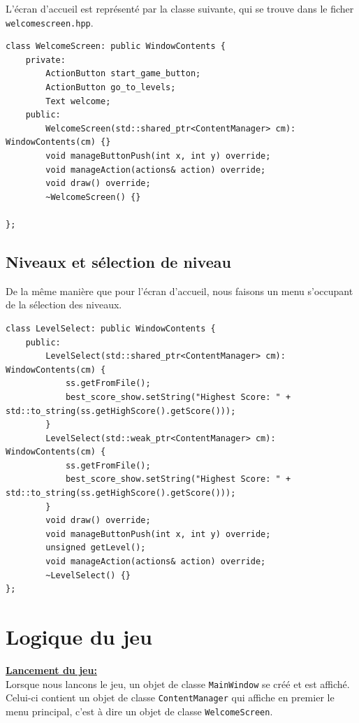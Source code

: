\documentclass[a4paper, 12pt]{article}
\begin{document}
L'écran d'accueil est représenté par la classe suivante,
qui se trouve dans le ficher \texttt{welcome\textunderscore screen.hpp}.
\begin{lstlisting}
class WelcomeScreen: public WindowContents {
    private:
        ActionButton start_game_button;
        ActionButton go_to_levels;
        Text welcome;
    public:
        WelcomeScreen(std::shared_ptr<ContentManager> cm): WindowContents(cm) {}
        void manageButtonPush(int x, int y) override;
        void manageAction(actions& action) override;
        void draw() override;
        ~WelcomeScreen() {}

};
\end{lstlisting}

\subsection{Niveaux et sélection de niveau}

De la même manière que pour l'écran d'accueil, 
nous faisons un menu s'occupant de la sélection des niveaux.
\begin{lstlisting}
class LevelSelect: public WindowContents {
    public:
        LevelSelect(std::shared_ptr<ContentManager> cm): WindowContents(cm) {
            ss.getFromFile();
            best_score_show.setString("Highest Score: " + std::to_string(ss.getHighScore().getScore()));
        }
        LevelSelect(std::weak_ptr<ContentManager> cm): WindowContents(cm) {
            ss.getFromFile();
            best_score_show.setString("Highest Score: " + std::to_string(ss.getHighScore().getScore()));
        }
        void draw() override;
        void manageButtonPush(int x, int y) override;
        unsigned getLevel();
        void manageAction(actions& action) override;
        ~LevelSelect() {}
};
\end{lstlisting}

\section{Logique du jeu}

\underline{\textbf{Lancement du jeu:}}  \vspace{0.2cm}\\
Lorsque nous lancons le jeu, un objet de classe \texttt{MainWindow} se créé 
et est affiché. 
Celui-ci contient un objet de classe \texttt{ContentManager} qui affiche en premier le
menu principal, c'est à dire un objet de classe \texttt{WelcomeScreen}. \\
\end{document}

